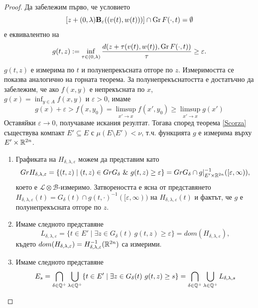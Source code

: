 \begin{proof}
    Да забележим първо, че условието
    \[
        [z+(0, \lambda)\textbf{B}_{\varepsilon}((v(t),w(t)))]\cap\operatorname{Gr} F(\cdot, t)=\emptyset
    \]
    е еквивалентно на
    \[
        g(t, z):=\inf_{\tau\in(0,\lambda)}\frac{d(z+\tau(v(t),w(t)), \operatorname{Gr} F(\cdot, t))}{\tau} \geq \varepsilon.
    \]
    $g(t,z)$ е измерима по $t$ и полунепрекъсната отгоре по $z$.
    Измеримостта се показва аналогично на горната теорема.
    За полунепрекъснатостта е достатъчно да забележим, че ако $f(x,y)$ е непрекъсната по $x$,\\ $g(x) = \inf_{y\in A} f(x,y)$ и $\varepsilon > 0$, имаме
    \[
        g(x) + \varepsilon > f(x,y_0) = \limsup_{x'\to x} f(x',y_0) \geq \limsup_{x'\to x} g(x')
    \]
    Оставяйки $\varepsilon\to 0$, получаваме искания резултат.
    Тогава според теорема \ref{Scorza} съществува компакт $E'\subseteq E$ с $\mu(E\setminus E')<\nu$, т.ч. функцията $g$ е измерима върху $E'\times\mathbb{R}^{2n}$.
    \begin{enumerate}
        \item
            Графиката на $H_{\delta,\lambda,\varepsilon}$ можем да представим като
            \[
                Gr H_{\delta,\lambda,\varepsilon} = \{(t,z) \mid (t,z)\in Gr G_{\delta}\ \&\ g(t,z)\geq\varepsilon\} =
                Gr G_{\delta} \cap g\vert_{E'\times\R^{2n}}^{-1}([\varepsilon, \infty)),
            \]
            което е $\mathcal{L}\otimes\mathcal{B}$-измеримо.
            Затвореността е ясна от представянето $H_{\delta,\lambda,\varepsilon}(t) = G_\delta(t) \cap g(t,\cdot)^{-1}([\varepsilon,\infty))$ на $H_{\delta,\lambda,\varepsilon}(t)$ и фактът, че $g$ е полунепрекъсната отгоре по $z$.
        \item
            Имаме следното представяне
            \[
                L_{\delta,\lambda,\varepsilon} =
                \{t\in E' \mid \exists z\in G_{\delta}(t)\ g(t,z)\geq\varepsilon\}=
                dom(H_{\delta,\lambda,\varepsilon}),
            \]
            където $dom(H_{\delta,\lambda,\varepsilon}) = H_{\delta,\lambda,\varepsilon}^{-1}(\mathbb{R}^{2n})$ са измерими.
        \item
            Имаме следното представяне
            \[
                E_s =
                \bigcap_{\delta\in\mathbb{Q}^+} \bigcup_{\lambda\in\mathbb{Q}^+} \{t\in E' \mid \exists z\in G_{\delta}(t)\ g(t,z)\geq s\} =
                \bigcap_{\delta\in\mathbb{Q}^+} \bigcup_{\lambda\in\mathbb{Q}^+} L_{\delta,\lambda,s}
            \]
    \end{enumerate}
\end{proof}

